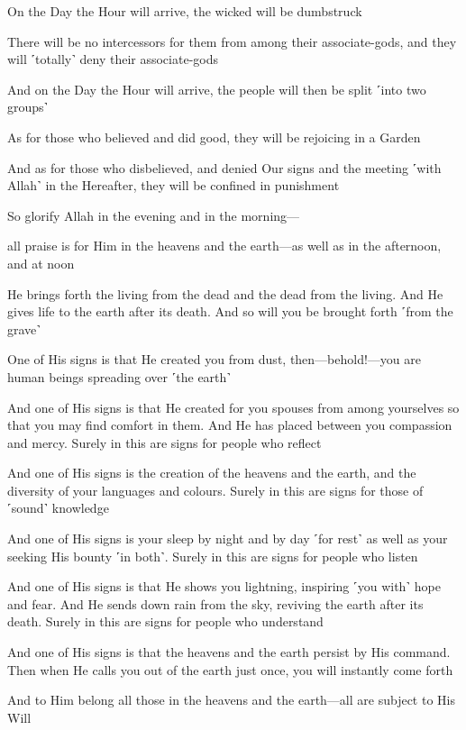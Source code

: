 On the Day the Hour will arrive, the wicked will be dumbstruck

There will be no intercessors for them from among their associate-gods, and they will ˹totally˺ deny their associate-gods

And on the Day the Hour will arrive, the people will then be split ˹into two groups˺

As for those who believed and did good, they will be rejoicing in a Garden

And as for those who disbelieved, and denied Our signs and the meeting ˹with Allah˺ in the Hereafter, they will be confined in punishment

So glorify Allah in the evening and in the morning—

all praise is for Him in the heavens and the earth—as well as in the afternoon, and at noon

He brings forth the living from the dead and the dead from the living. And He gives life to the earth after its death. And so will you be brought forth ˹from the grave˺

One of His signs is that He created you from dust, then—behold!—you are human beings spreading over ˹the earth˺

And one of His signs is that He created for you spouses from among yourselves so that you may find comfort in them. And He has placed between you compassion and mercy. Surely in this are signs for people who reflect

And one of His signs is the creation of the heavens and the earth, and the diversity of your languages and colours. Surely in this are signs for those of ˹sound˺ knowledge

And one of His signs is your sleep by night and by day ˹for rest˺ as well as your seeking His bounty ˹in both˺. Surely in this are signs for people who listen

And one of His signs is that He shows you lightning, inspiring ˹you with˺ hope and fear. And He sends down rain from the sky, reviving the earth after its death. Surely in this are signs for people who understand

And one of His signs is that the heavens and the earth persist by His command. Then when He calls you out of the earth just once, you will instantly come forth

And to Him belong all those in the heavens and the earth—all are subject to His Will

